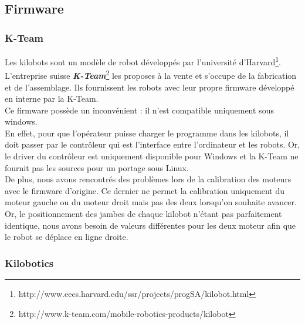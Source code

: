 \documentclass[a4paper,8pt]{report}
\begin{document}
\newpage
\subsection*{Firmware}\label{subsec:name}

\subsubsection*{K-Team}\label{subsubsec:name}

Les kilobots sont un mod\`ele de robot d\'evelopp\'es par l'universit\'e d'Harvard\footnote{http://www.eecs.harvard.edu/ssr/projects/progSA/kilobot.html}. L'entreprise suisse \textit{\textbf{K-Team}}\footnote{http://www.k-team.com/mobile-robotics-products/kilobot} les proposes \`a la vente et s'occupe de la fabrication et de l'assemblage. Ils fournissent les robots avec leur propre firmware d\'evelopp\'e en interne par la K-Team. \\
Ce firmware poss\`ede un inconv\'enient : il n'est compatible uniquement sous windows. \\
En effet, pour que l'op\'erateur puisse charger le programme dans les kilobots, il doit passer par le contr\^oleur qui est l'interface entre l'ordinateur et les robots. Or, le driver du contr\^oleur est uniquement disponible pour Windows et la K-Team ne fournit pas les sources pour un portage sous Linux. \\
De plus, nous avons rencontr\'es des probl\`emes lors de la calibration des moteurs avec le firmware d'origine. Ce dernier ne permet la calibration uniquement du moteur gauche ou du moteur droit mais pas des deux lorsqu'on souhaite avancer. Or, le positionnement des jambes de chaque kilobot n'\'etant pas parfaitement identique, nous avons besoin de valeurs diff\'erentes pour les deux moteur afin que le robot se d\'eplace en ligne droite.\\

\subsubsection*{Kilobotics}\label{subsubsec:name}
\end{document}
